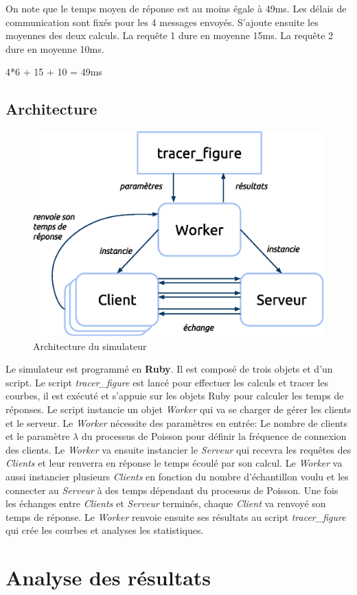 \documentclass[a4paper, 12pt]{exam}
\begin{document}
On note que le temps moyen de réponse est au moins égale à 49ms. Les délais de communication sont fixés pour les 4 messages envoyés. S'ajoute ensuite les moyennes des deux calculs. La requête 1 dure en moyenne 15ms. La requête 2 dure en moyenne 10ms.

4*6 + 15 + 10 = 49ms

\subsection{Architecture}

\begin{figure}[!h]
\begin{center}
  \includegraphics[scale=0.7]{image/architecture}
  \caption{Architecture du simulateur}
  \label{architecture}
\end{center}
\end{figure}

Le simulateur est programmé en \textbf{Ruby}. Il est composé de trois objets et d'un script. Le script \textit{tracer\_figure} est lancé pour effectuer les calculs et tracer les courbes, il est exécuté et s'appuie sur les objets Ruby pour calculer les temps de réponses. Le script instancie un objet \textit{Worker} qui va se charger de gérer les clients et le serveur. Le \textit{Worker} nécessite des paramètres en entrée: Le nombre de clients et le paramètre $\lambda$ du processus de Poisson pour définir la fréquence de connexion des clients. Le \textit{Worker} va ensuite instancier le \textit{Serveur} qui recevra les requêtes des \textit{Clients} et leur renverra en réponse le temps écoulé par son calcul. Le \textit{Worker} va aussi instancier plusieurs \textit{Clients} en fonction du nombre d'échantillon voulu et les connecter au \textit{Serveur} à des temps dépendant du processus de Poisson. Une fois les échanges entre \textit{Clients} et \textit{Serveur} terminés, chaque \textit{Client} va renvoyé son temps de réponse. Le \textit{Worker} renvoie ensuite ses résultats au script \textit{tracer\_figure} qui crée les courbes et analyses les statistiques.



\section{Analyse des résultats}
\end{document}
